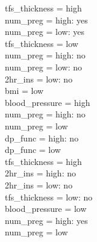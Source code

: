 \documentclass[12pt]{article}
\begin{document}
\textbar\quad \textbar\quad \textbar\quad \textbar\quad \textbar\quad \textbar\quad tfs\_thickness = high\\
\textbar\quad \textbar\quad \textbar\quad \textbar\quad \textbar\quad \textbar\quad \textbar\quad num\_preg = high: yes\\
\textbar\quad \textbar\quad \textbar\quad \textbar\quad \textbar\quad \textbar\quad \textbar\quad num\_preg = low: yes\\
\textbar\quad \textbar\quad \textbar\quad \textbar\quad \textbar\quad \textbar\quad tfs\_thickness = low\\
\textbar\quad \textbar\quad \textbar\quad \textbar\quad \textbar\quad \textbar\quad \textbar\quad num\_preg = high: no\\
\textbar\quad \textbar\quad \textbar\quad \textbar\quad \textbar\quad \textbar\quad \textbar\quad num\_preg = low: no\\
\textbar\quad \textbar\quad \textbar\quad \textbar\quad 2hr\_ins = low: no\\
\textbar\quad \textbar\quad bmi = low\\
\textbar\quad \textbar\quad \textbar\quad blood\_pressure = high\\
\textbar\quad \textbar\quad \textbar\quad \textbar\quad num\_preg = high: no\\
\textbar\quad \textbar\quad \textbar\quad \textbar\quad num\_preg = low\\
\textbar\quad \textbar\quad \textbar\quad \textbar\quad \textbar\quad dp\_func = high: no\\
\textbar\quad \textbar\quad \textbar\quad \textbar\quad \textbar\quad dp\_func = low\\
\textbar\quad \textbar\quad \textbar\quad \textbar\quad \textbar\quad \textbar\quad tfs\_thickness = high\\
\textbar\quad \textbar\quad \textbar\quad \textbar\quad \textbar\quad \textbar\quad \textbar\quad 2hr\_ins = high: no\\
\textbar\quad \textbar\quad \textbar\quad \textbar\quad \textbar\quad \textbar\quad \textbar\quad 2hr\_ins = low: no\\
\textbar\quad \textbar\quad \textbar\quad \textbar\quad \textbar\quad \textbar\quad tfs\_thickness = low: no\\
\textbar\quad \textbar\quad \textbar\quad blood\_pressure = low\\
\textbar\quad \textbar\quad \textbar\quad \textbar\quad num\_preg = high: yes\\
\textbar\quad \textbar\quad \textbar\quad \textbar\quad num\_preg = low\\
\end{document}
